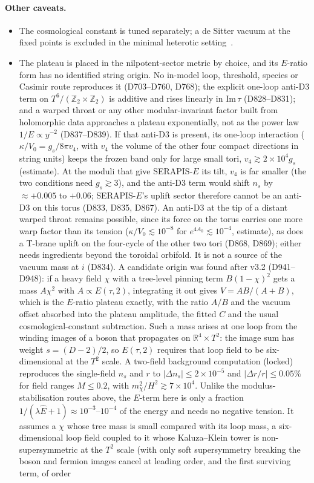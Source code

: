 \documentclass[aps,prd,twocolumn,superscriptaddress,nofootinbib,floatfix]{revtex4-2}
\begin{document}
\paragraph{Other caveats.}
\begin{itemize}
\item The cosmological constant is tuned separately; a de Sitter vacuum at the fixed points is excluded in the minimal heterotic setting~\cite{arXiv_2212_03876}.
\item The plateau is placed in the nilpotent-sector metric by choice, and its $E$-ratio form has no identified string origin. No in-model loop, threshold, species or Casimir route reproduces it (D703--D760, D768); the explicit one-loop anti-D3 term on $T^6/(\mathbb{Z}_2\times\mathbb{Z}_2)$ is additive and rises linearly in $\mathrm{Im}\,\tau$ (D828--D831); and a warped throat or any other modular-invariant factor built from holomorphic data approaches a plateau exponentially, not as the power law $1/E\propto y^{-2}$ (D837--D839). If that anti-D3 is present, its one-loop interaction ($\kappa/V_0=g_s/8\pi v_4$, with $v_4$ the volume of the other four compact directions in string units) keeps the frozen band only for large small tori, $v_4\gtrsim2\times10^4g_s$ (estimate). At the moduli that give SERAPIS-$E$ its tilt, $v_4$ is far smaller (the two conditions need $g_s\gtrsim3$), and the anti-D3 term would shift $n_s$ by $\approx+0.005$ to $+0.06$; SERAPIS-$E$'s uplift sector therefore cannot be an anti-D3 on this torus (D833, D835, D867). An anti-D3 at the tip of a distant warped throat remains possible, since its force on the torus carries one more warp factor than its tension ($\kappa/V_0\lesssim10^{-8}$ for $e^{4A_0}\lesssim10^{-4}$, estimate), as does a T-brane uplift on the four-cycle of the other two tori (D868, D869); either needs ingredients beyond the toroidal orbifold. It is not a source of the vacuum mass at $i$ (D834). A candidate origin was found after v3.2 (D941--D948): if a heavy field $\chi$ with a tree-level pinning term $B(1-\chi)^2$ gets a mass $A\chi^2$ with $A\propto E(\tau,2)$, integrating it out gives $V=AB/(A+B)$, which is the $E$-ratio plateau exactly, with the ratio $A/B$ and the vacuum offset absorbed into the plateau amplitude, the fitted $C$ and the usual cosmological-constant subtraction. Such a mass arises at one loop from the winding images of a boson that propagates on $\mathbb{R}^4\times T^2$: the image sum has weight $s=(D-2)/2$, so $E(\tau,2)$ requires that loop field to be six-dimensional at the $T^2$ scale. A two-field background computation (locked) reproduces the single-field $n_s$ and $r$ to $|\Delta n_s|\le2\times10^{-5}$ and $|\Delta r/r|\le0.05\%$ for field ranges $M\le0.2$, with $m_\chi^2/H^2\gtrsim7\times10^4$. Unlike the modulus-stabilisation routes above, the $E$-term here is only a fraction $1/(\lambda\hat E+1)\approx10^{-3}$--$10^{-4}$ of the energy and needs no negative tension. It assumes a $\chi$ whose tree mass is small compared with its loop mass, a six-dimensional loop field coupled to it whose Kaluza--Klein tower is non-supersymmetric at the $T^2$ scale (with only soft supersymmetry breaking the boson and fermion images cancel at leading order, and the first surviving term, of order 
\end{itemize}
\end{document}
